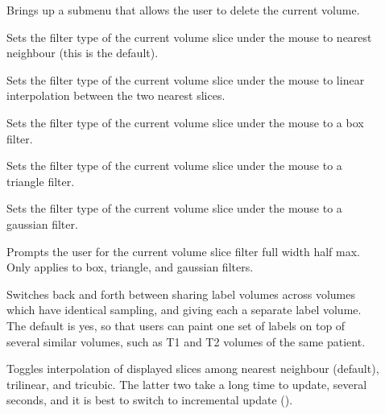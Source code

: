 \begin{description}
\item[]  Brings up a submenu that
       allows the user to delete the current volume.
\item[]  Sets the filter type of
                       the current volume slice under the mouse to nearest
                       neighbour (this is the default).
\item[]  Sets the filter type of
                       the current volume slice under the mouse to
                       linear interpolation
                       between the two nearest slices.
\item[]  Sets the filter type of
                       the current volume slice under the mouse to a box filter.
\item[]  Sets the filter type of
                      the current volume slice under the mouse to a
                      triangle filter.
\item[]  Sets the filter type of
                      the current volume slice under the mouse to a
                      gaussian filter.
\item[]  Prompts the user for
                      the current volume slice filter full width half max.
                      Only applies to box, triangle, and gaussian filters.
\item[]  Switches back and forth
                      between sharing
                      label volumes across volumes which have identical
                      sampling, and giving each a separate label volume.
                      The default is yes, so that users can paint one set
                      of labels on top of several similar volumes, such as
                      T1 and T2 volumes of the same patient.
\item[]  Toggles interpolation of
                      displayed slices among nearest neighbour
                      (default), trilinear, and tricubic.  The latter
                      two take a long time to update, several seconds,
                      and it is best to switch to incremental update
                      ().
\end{description}

